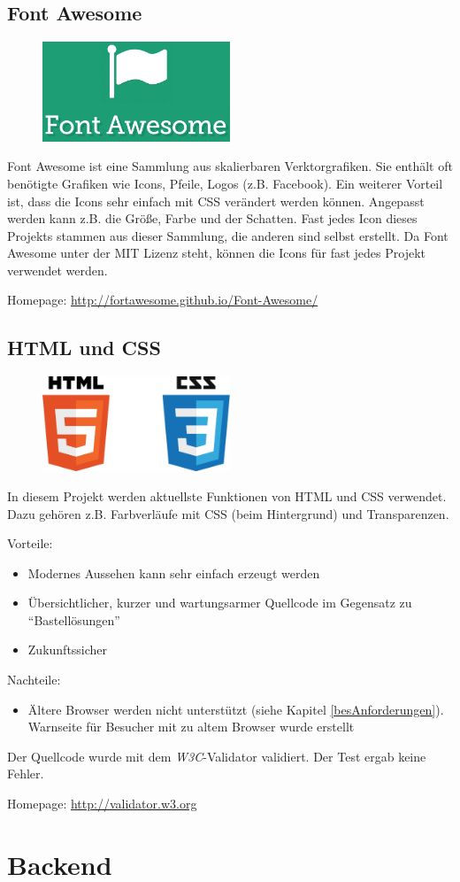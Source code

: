 \subsection{Font Awesome}
\begin{figure}[h]
  \centering
  \includegraphics[width=0.5\textwidth]{images/fontawesome_logo.png}
\end{figure}
Font Awesome ist eine Sammlung aus skalierbaren Verktorgrafiken. Sie enthält oft benötigte Grafiken wie Icons, Pfeile, Logos (z.B. Facebook). Ein weiterer Vorteil ist, dass die Icons sehr einfach mit CSS verändert werden können. Angepasst werden kann z.B. die Größe, Farbe und der Schatten. Fast jedes Icon dieses Projekts stammen aus dieser Sammlung, die anderen sind selbst erstellt. Da Font Awesome unter der MIT Lizenz steht, können die Icons für fast jedes Projekt verwendet werden.

Homepage: \url{http://fortawesome.github.io/Font-Awesome/}

\subsection{HTML und CSS}
\begin{figure}[h]
  \centering
  \includegraphics[width=0.5\textwidth]{images/html5_css_logo.pdf}
\end{figure}
In diesem Projekt werden aktuellste Funktionen von HTML und CSS verwendet. Dazu gehören z.B. Farbverläufe mit CSS (beim Hintergrund) und Transparenzen. 

Vorteile:
\begin{itemize}
	\item Modernes Aussehen kann sehr einfach erzeugt werden
	\item Übersichtlicher, kurzer und wartungsarmer Quellcode im Gegensatz zu ``Bastellösungen''
	\item Zukunftssicher
\end{itemize}
Nachteile:
\begin{itemize}
	\item Ältere Browser werden nicht unterstützt (siehe Kapitel \ref{besAnforderungen}). Warnseite für Besucher mit zu altem Browser wurde erstellt
\end{itemize}

Der Quellcode wurde mit dem \textit{W3C}-Validator validiert. Der Test ergab keine Fehler.

Homepage: \url{http://validator.w3.org}

\section{Backend}